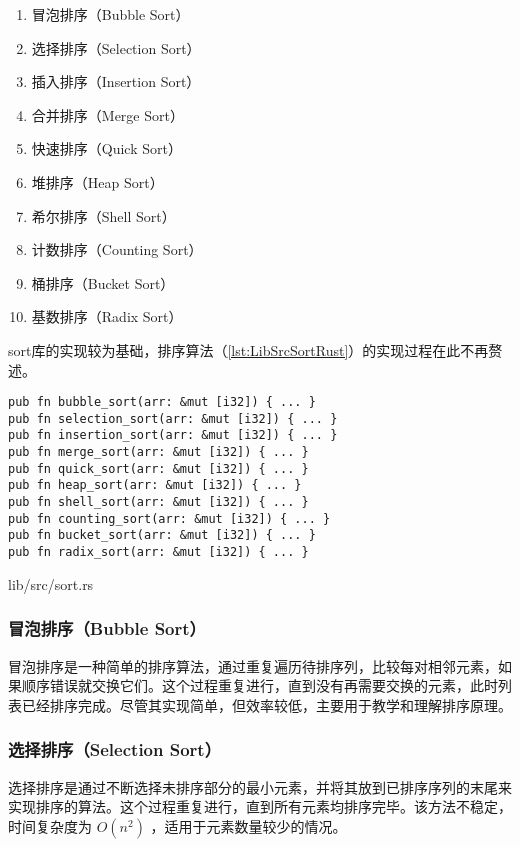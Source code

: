 \begin{enumerate}
    \item 冒泡排序（Bubble Sort）
    \item 选择排序（Selection Sort）
    \item 插入排序（Insertion Sort）
    \item 合并排序（Merge Sort）
    \item 快速排序（Quick Sort）
    \item 堆排序（Heap Sort）
    \item 希尔排序（Shell Sort）
    \item 计数排序（Counting Sort）
    \item 桶排序（Bucket Sort）
    \item 基数排序（Radix Sort）
\end{enumerate}

sort库的实现较为基础，排序算法（\cref{lst:LibSrcSortRust}）的实现过程在此不再赘述。

\begin{listing}[htbp]
    \begin{verbatim}
pub fn bubble_sort(arr: &mut [i32]) { ... }
pub fn selection_sort(arr: &mut [i32]) { ... }
pub fn insertion_sort(arr: &mut [i32]) { ... }
pub fn merge_sort(arr: &mut [i32]) { ... }
pub fn quick_sort(arr: &mut [i32]) { ... }
pub fn heap_sort(arr: &mut [i32]) { ... }
pub fn shell_sort(arr: &mut [i32]) { ... }
pub fn counting_sort(arr: &mut [i32]) { ... }
pub fn bucket_sort(arr: &mut [i32]) { ... }
pub fn radix_sort(arr: &mut [i32]) { ... }
    \end{verbatim}
    \caption{lib/src/sort.rs}\label{lst:LibSrcSortRust}
\end{listing}

\subsubsection{冒泡排序（Bubble Sort）}

冒泡排序是一种简单的排序算法，通过重复遍历待排序列，比较每对相邻元素，如果顺序错误就交换它们。这个过程重复进行，直到没有再需要交换的元素，此时列表已经排序完成。尽管其实现简单，但效率较低，主要用于教学和理解排序原理。

\subsubsection{选择排序（Selection Sort）}

选择排序是通过不断选择未排序部分的最小元素，并将其放到已排序序列的末尾来实现排序的算法。这个过程重复进行，直到所有元素均排序完毕。该方法不稳定，时间复杂度为 $O(n^2)$ ，适用于元素数量较少的情况。

